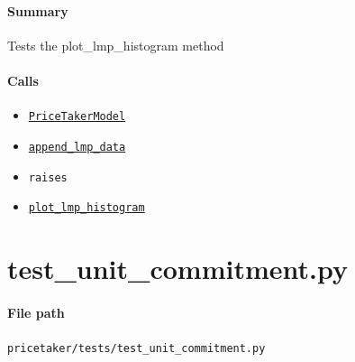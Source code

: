 \documentclass[11pt]{report}
\begin{document}
\paragraph{Summary} Tests the plot\_lmp\_histogram method
\paragraph{Calls}
\begin{itemize}[leftmargin=*]
  \item \hyperref[def:pricetaker-price_taker_model.py:PriceTakerModel:L161]{\texttt{PriceTakerModel}}
  \item \hyperref[def:pricetaker-price_taker_model.py:PriceTakerModel.append_lmp_data:L221]{\texttt{append\_lmp\_data}}
  \item \texttt{raises}
  \item \hyperref[def:pricetaker-price_taker_model.py:PriceTakerModel.plot_lmp_histogram:L1352]{\texttt{plot\_lmp\_histogram}}
\end{itemize}

\section{test\_unit\_commitment.py}
\label{file:pricetaker-tests-test_unit_commitment.py}
\paragraph{File path} \texttt{pricetaker/tests/test\_unit\_commitment.py}
\end{document}
